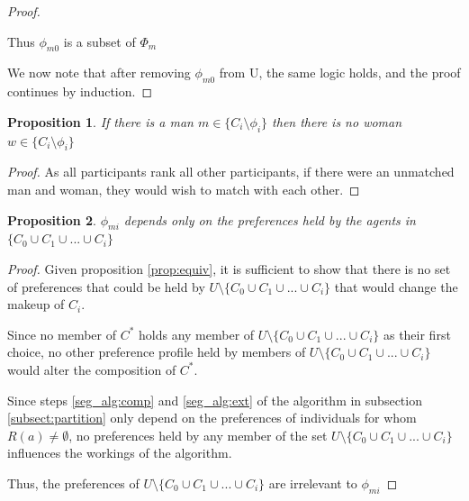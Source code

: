 \documentclass[WP]{AEA}
\newtheorem{prop}{Proposition}
\newtheorem{conj}{Conjecture}
\begin{document}
\begin{proof}
\begin{itemize}
	\end{itemize}
	Thus $\phi_{m0}$ is a subset of $\Phi_m$
	
	We now note that after removing $\phi_{m0}$ from U, the same logic holds, and the proof continues by induction. 
\end{proof}


\begin{prop}
	If there is a man $m \in \{C_i  \setminus \phi_i\}$ then there is no woman $w \in \{C_i  \setminus \phi_i\}$
\end{prop}
\begin{proof}
	As all participants rank all other participants, if there were an unmatched man and woman, they would wish to match with each other.
\end{proof}

\begin{prop}
	$\phi_{mi}$ depends only on the preferences held by the agents in $ \{C_0 \cup C_1 \cup  ...\cup C_i\}$
\end{prop}
\begin{proof}

	Given proposition \ref{prop:equiv}, it is sufficient to show that there is no set of preferences that could be held by $U \setminus \{C_0 \cup C_1 \cup  ...\cup C_i\}$ that would change the makeup of $C_i$. 
	
	Since no member of $C^*$ holds any member of $U \setminus \{C_0 \cup C_1 \cup  ...\cup C_i\}$  as their first choice, no other preference profile held by members of $U \setminus \{C_0 \cup C_1 \cup  ...\cup C_i\}$ would alter the composition of $C^*$.
	
	Since steps \ref{seg_alg:comp} and \ref{seg_alg:ext} of the algorithm in subsection \ref{subsect:partition} only depend on the preferences of individuals for whom $R(a)\neq \emptyset$, no preferences held by any member of the set $U \setminus \{C_0 \cup C_1 \cup  ...\cup C_i\}$ influences the workings of the algorithm.
	
	Thus, the  preferences of  $U \setminus \{C_0 \cup C_1 \cup  ...\cup C_i\}$ are irrelevant to $\phi_{mi}$
\end{proof}

\end{document}

